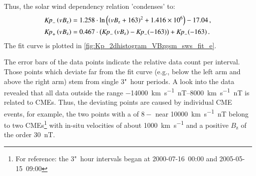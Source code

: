 Thus, the solar wind dependency relation 'condenses' to:
\begin{align}
	\text{\textit{Kp}}_-\left(vB_\text{z}\right) &= 1.258 \cdot \ln\left(\left(vB_\text{z} + 163\right)^2 + \num{1.416e6}\right) - 17.04	\,,	\label{eq:kpvsvbz_dependency_function_negative}\\
	\text{\textit{Kp}}_+\left(vB_\text{z}\right) &= 0.467 \cdot \left(\text{\textit{Kp}}_-\left(vB_\text{z}\right) - \text{\textit{Kp}}_-(-163)\right) + \text{\textit{Kp}}_-(-163)	\,.	\label{eq:kpvsvbz_dependency_function_positive}
\end{align}
The fit curve is plotted in \autoref{fig:Kp_2dhistogram_VBzgsm_sws_fit_e}.
\begin{figure}
\end{figure}
The error bars of the data points indicate the relative data count per \vBz{} interval. Those points which deviate far from the fit curve (e.g., below the left arm and above the right arm) stem from single 3"~hour periods. A look into the data revealed that all data outside the range \SIrange{-14000}{8000}{\km\per\s\nano\tesla} is related to CMEs. Thus, the deviating points are caused by individual CME events, for example, the two points with a \Kp{} of $8-$ near \SI{10000}{\km\per\s\nano\tesla} belong to two CMEs\footnote{For reference: the 3"~hour intervals began at 2000-07-16~00:00 and 2005-05-15~09:00} with in-situ velocities of about \SI{1000}{\km\per\s} and a positive $B_\text{z}$ of the order \SI{30}{\nano\tesla}.

